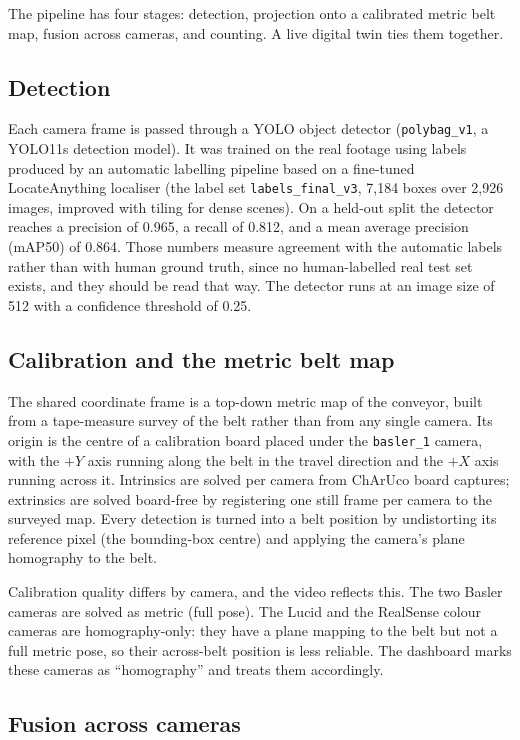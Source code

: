 \documentclass[11pt,a4paper]{article}
\newcommand{\code}[1]{\texttt{#1}}
\begin{document}
The pipeline has four stages: detection, projection onto a calibrated metric belt
map, fusion across cameras, and counting. A live digital twin ties them together.

\subsection{Detection}

Each camera frame is passed through a YOLO object detector (\code{polybag\_v1}, a
YOLO11s detection model). It was trained on the real footage using labels produced
by an automatic labelling pipeline based on a fine-tuned LocateAnything localiser
(the label set \code{labels\_final\_v3}, 7{,}184 boxes over 2{,}926 images,
improved with tiling for dense scenes). On a held-out split the detector reaches a
precision of 0.965, a recall of 0.812, and a mean average precision (mAP50) of
0.864. Those numbers measure agreement with the automatic labels rather than with
human ground truth, since no human-labelled real test set exists, and they should
be read that way. The detector runs at an image size of 512 with a confidence
threshold of 0.25.

\subsection{Calibration and the metric belt map}

The shared coordinate frame is a top-down metric map of the conveyor, built from a
tape-measure survey of the belt rather than from any single camera. Its origin is
the centre of a calibration board placed under the \code{basler\_1} camera, with
the $+Y$ axis running along the belt in the travel direction and the $+X$ axis
running across it. Intrinsics are solved per camera from ChArUco board captures;
extrinsics are solved board-free by registering one still frame per camera to the
surveyed map. Every detection is turned into a belt position by undistorting its
reference pixel (the bounding-box centre) and applying the camera's plane
homography to the belt.

Calibration quality differs by camera, and the video reflects this. The two Basler
cameras are solved as metric (full pose). The Lucid and the RealSense colour
cameras are homography-only: they have a plane mapping to the belt but not a full
metric pose, so their across-belt position is less reliable. The dashboard marks
these cameras as ``homography'' and treats them accordingly.

\subsection{Fusion across cameras}
\end{document}
